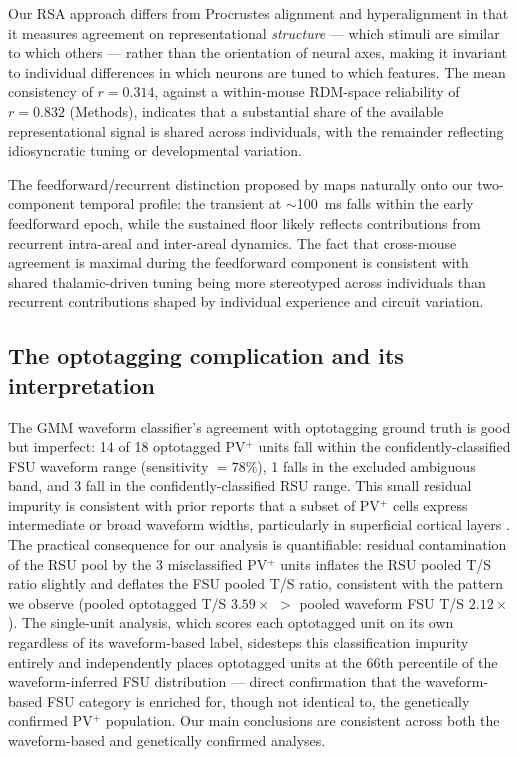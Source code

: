 \documentclass[11pt,onecolumn]{article}
\begin{document}
Our RSA approach differs from Procrustes alignment \citep{williams2021}
and hyperalignment \citep{haxby2011} in that it measures agreement on
representational \textit{structure} --- which stimuli are similar to which
others --- rather than the orientation of neural axes, making it invariant
to individual differences in which neurons are tuned to which features.
The mean consistency of $r = 0.314$, against a within-mouse RDM-space
reliability of $r = 0.832$ (Methods), indicates that a substantial share
of the available representational signal is shared across individuals,
with the remainder reflecting idiosyncratic tuning or developmental
variation.

The feedforward/recurrent distinction proposed by \citet{lamme2000} maps
naturally onto our two-component temporal profile: the transient at
$\sim$100~ms falls within the early feedforward epoch, while the sustained
floor likely reflects contributions from recurrent intra-areal and
inter-areal dynamics.  The fact that cross-mouse agreement is maximal
during the feedforward component is consistent with shared thalamic-driven
tuning being more stereotyped across individuals than recurrent
contributions shaped by individual experience and circuit variation.

\subsection{The optotagging complication and its interpretation}

The GMM waveform classifier's agreement with optotagging ground truth is
good but imperfect: 14 of 18 optotagged PV$^+$ units fall within the
confidently-classified FSU waveform range (sensitivity $= 78\%$), 1 falls
in the excluded ambiguous band, and 3 fall in the confidently-classified
RSU range.  This small residual impurity is consistent with prior reports
that a subset of PV$^+$ cells express intermediate or broad waveform
widths, particularly in superficial cortical layers
\citep{bartho2004,mccormick1985}.  The practical consequence for our
analysis is quantifiable: residual contamination of the RSU pool by the 3
misclassified PV$^+$ units inflates the RSU pooled T/S ratio slightly and
deflates the FSU pooled T/S ratio, consistent with the pattern we observe
(pooled optotagged T/S $3.59\times$ $>$ pooled waveform FSU T/S
$2.12\times$).  The single-unit analysis, which scores each optotagged
unit on its own regardless of its waveform-based label, sidesteps this
classification impurity entirely and independently places optotagged
units at the 66th percentile of the waveform-inferred FSU distribution
--- direct confirmation that the waveform-based FSU category is enriched
for, though not identical to, the genetically confirmed PV$^+$
population.  Our main conclusions are consistent across both the
waveform-based and genetically confirmed analyses.
\end{document}
